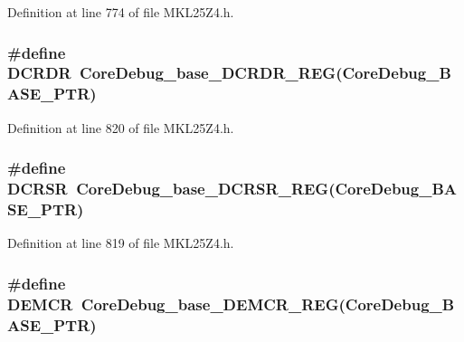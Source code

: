 Definition at line 774 of file M\+K\+L25\+Z4.\+h.

\subsubsection[{\texorpdfstring{D\+C\+R\+DR}{DCRDR}}]{\setlength{\rightskip}{0pt plus 5cm}\#define D\+C\+R\+DR~{\bf Core\+Debug\+\_\+base\+\_\+\+D\+C\+R\+D\+R\+\_\+\+R\+EG}({\bf Core\+Debug\+\_\+\+B\+A\+S\+E\+\_\+\+P\+TR})}\hypertarget{group___core_debug___register___accessor___macros_gaaa7a4f8f79faea1305f3398257c656a0}{}\label{group___core_debug___register___accessor___macros_gaaa7a4f8f79faea1305f3398257c656a0}


Definition at line 820 of file M\+K\+L25\+Z4.\+h.

\subsubsection[{\texorpdfstring{D\+C\+R\+SR}{DCRSR}}]{\setlength{\rightskip}{0pt plus 5cm}\#define D\+C\+R\+SR~{\bf Core\+Debug\+\_\+base\+\_\+\+D\+C\+R\+S\+R\+\_\+\+R\+EG}({\bf Core\+Debug\+\_\+\+B\+A\+S\+E\+\_\+\+P\+TR})}\hypertarget{group___core_debug___register___accessor___macros_gabd5ddab120c0e09c0198d49c25713be3}{}\label{group___core_debug___register___accessor___macros_gabd5ddab120c0e09c0198d49c25713be3}


Definition at line 819 of file M\+K\+L25\+Z4.\+h.

\subsubsection[{\texorpdfstring{D\+E\+M\+CR}{DEMCR}}]{\setlength{\rightskip}{0pt plus 5cm}\#define D\+E\+M\+CR~{\bf Core\+Debug\+\_\+base\+\_\+\+D\+E\+M\+C\+R\+\_\+\+R\+EG}({\bf Core\+Debug\+\_\+\+B\+A\+S\+E\+\_\+\+P\+TR})}\hypertarget{group___core_debug___register___accessor___macros_gab6c5b1baf444f12ba50bfc3b0e40e05c}{}\label{group___core_debug___register___accessor___macros_gab6c5b1baf444f12ba50bfc3b0e40e05c}


